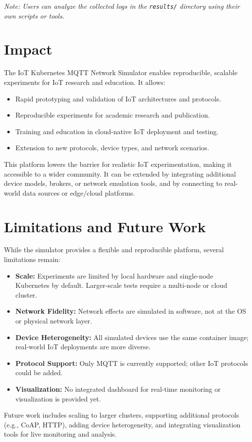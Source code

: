 \documentclass[review]{elsarticle}
\begin{document}
\textit{Note: Users can analyze the collected logs in the \texttt{results/} directory using their own scripts or tools.}

\section{Impact}
The IoT Kubernetes MQTT Network Simulator enables reproducible, scalable experiments for IoT research and education. It allows:
\begin{itemize}
    \item Rapid prototyping and validation of IoT architectures and protocols.
    \item Reproducible experiments for academic research and publication.
    \item Training and education in cloud-native IoT deployment and testing.
    \item Extension to new protocols, device types, and network scenarios.
\end{itemize}
This platform lowers the barrier for realistic IoT experimentation, making it accessible to a wider community. It can be extended by integrating additional device models, brokers, or network emulation tools, and by connecting to real-world data sources or edge/cloud platforms.

\section{Limitations and Future Work}
While the simulator provides a flexible and reproducible platform, several limitations remain:
\begin{itemize}
    \item \textbf{Scale:} Experiments are limited by local hardware and single-node Kubernetes by default. Larger-scale tests require a multi-node or cloud cluster.
    \item \textbf{Network Fidelity:} Network effects are simulated in software, not at the OS or physical network layer.
    \item \textbf{Device Heterogeneity:} All simulated devices use the same container image; real-world IoT deployments are more diverse.
    \item \textbf{Protocol Support:} Only MQTT is currently supported; other IoT protocols could be added.
    \item \textbf{Visualization:} No integrated dashboard for real-time monitoring or visualization is provided yet.
\end{itemize}
Future work includes scaling to larger clusters, supporting additional protocols (e.g., CoAP, HTTP), adding device heterogeneity, and integrating visualization tools for live monitoring and analysis.
\end{document}
